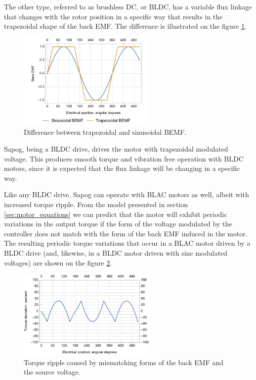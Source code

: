 \documentclass{zubaxdoc}
\begin{document}
The other type, referred to as brushless DC, or BLDC, has a variable flux linkage that changes with the
rotor position in a specific way that results in the trapezoidal shape of the back EMF.
The difference is illustrated on the figure \ref{bemf_trapezoidal_vs_sinusoidal}.

\begin{figure}[hbt]
    \centering
	\includegraphics[width=0.6\textwidth]{bemf_trapezoidal_vs_sinusoidal}
	\caption{Difference between trapezoidal and sinusoidal BEMF.
	\label{bemf_trapezoidal_vs_sinusoidal}}
\end{figure}

Sapog, being a BLDC drive, drives the motor with trapezoidal modulated voltage.
This produces smooth torque and vibration free operation with BLDC motors,
since it is expected that the flux linkage will be changing in a specific way.

Like any BLDC drive, Sapog can operate with BLAC motors as well, albeit with increased torque ripple.
From the model presented in section \ref{sec:motor_equations} we can predict that the motor
will exhibit periodic variations in the output torque if the form of the voltage modulated by the controller
does not match with the form of the back EMF induced in the motor.
The resulting periodic torque variations that occur in a BLAC motor driven by a BLDC drive
(and, likewise, in a BLDC motor driven with sine modulated voltages) are shown on the figure 
\ref{sine_torque_deviation}.

\begin{figure}[hbt]
    \centering
	\includegraphics[width=0.6\textwidth]{sine_torque_deviation}
	\caption{Torque ripple caused by mismatching forms of the back EMF and the source voltage.
	\label{sine_torque_deviation}}
\end{figure}
\end{document}
